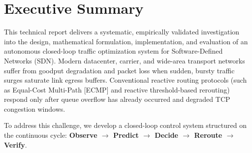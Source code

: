 \documentclass[11pt,a4paper,oneside]{report}
\begin{document}
\chapter*{Executive Summary}

This technical report delivers a systematic, empirically validated investigation into the design, mathematical formulation, implementation, and evaluation of an autonomous closed-loop traffic optimization system for Software-Defined Networks (SDN). Modern datacenter, carrier, and wide-area transport networks suffer from goodput degradation and packet loss when sudden, bursty traffic surges saturate link egress buffers. Conventional reactive routing protocols (such as Equal-Cost Multi-Path [ECMP] and reactive threshold-based rerouting) respond only after queue overflow has already occurred and degraded TCP congestion windows.

To address this challenge, we develop a closed-loop control system structured on the continuous cycle: \textbf{Observe $\longrightarrow$ Predict $\longrightarrow$ Decide $\longrightarrow$ Reroute $\longrightarrow$ Verify}.
\end{document}
